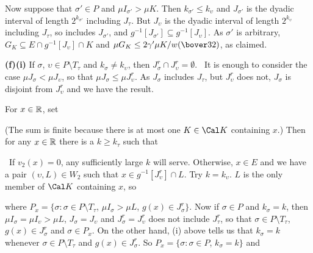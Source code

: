{Now suppose that $\sigma'\in P$ and $\mu I_{\sigma'}>\mu K$.   Then
$k_{\sigma'}\le k_{\upsilon}$ and
$J_{\sigma'}$ is the dyadic interval of length $2^{k_{\sigma'}}$
including $J_{\tau}$.   But $J_{\upsilon}$ is the dyadic interval of
length $2^{k_{\upsilon}}$ including $J_{\tau}$, so includes
$J_{\sigma'}$, and
$g^{-1}[J_{\sigma'}]\subseteq g^{-1}[J_{\upsilon}]$.   As $\sigma'$ is
arbitrary, $G_K\subseteq E\cap g^{-1}[J_{\upsilon}]\cap K$ and
$\mu G_K\le 2\gamma'\mu K/w(\bover32)$, as claimed.\ \Qed

\medskip

{\bf (f)(i)} If $\sigma$, $\upsilon\in P\setminus T_{\tau}$ and
$k_{\sigma}\ne k_{\upsilon}$, then
$J^r_{\sigma}\cap J^r_{\upsilon}=\emptyset$.   \Prf\
It is enough to consider the case $\mu J_{\sigma}<\mu J_{\upsilon}$, so
that $\mu J_{\sigma}\le\mu J^r_{\upsilon}$.   As $J_{\sigma}$ includes
$J_{\tau}$, but $J^r_{\upsilon}$ does not, $J_{\sigma}$ is disjoint from
$J^r_{\upsilon}$ and we have the result.\ \Qed

\medskip

 For $x\in\Bbb R$, set


\noindent (The sum is finite because there is at most one $K\in\Cal K$
containing $x$.)   Then for any $x\in\Bbb R$ there is a
$k\ge k_{\tau}$ such that


\noindent\Prf\ If $v_2(x)=0$, any sufficiently large $k$ will serve.
Otherwise, $x\in E$ and we have a pair
$(\upsilon,L)\in W_2$ such that
$x\in g^{-1}[J^r_{\upsilon}]\cap L$.   Try $k=k_{\upsilon}$.
$L$ is the only member of $\Cal K$ containing $x$, so


\noindent where $P_x=\{\sigma:\sigma\in P\setminus T_{\tau}$,
$\mu I_{\sigma}>\mu L$, $g(x)\in J^r_{\sigma}\}$.   Now if
$\sigma\in P$ and $k_{\sigma}=k$, then
$\mu I_{\sigma}=\mu I_{\upsilon}>\mu L$, $J_{\sigma}=J_{\upsilon}$ and
$J^r_{\sigma}=J^r_{\upsilon}$ does not include $J^r_{\tau}$, so that
$\sigma\in P\setminus T_{\tau}$, $g(x)\in J^r_{\sigma}$ and
$\sigma\in P_x$.   On the other hand, (i) above tells us that
$k_{\sigma}=k$ whenever $\sigma\in P\setminus T_{\tau}$ and
$g(x)\in J^r_{\sigma}$.   So
$P_x=\{\sigma:\sigma\in P$, $k_{\sigma}=k\}$ and

}
